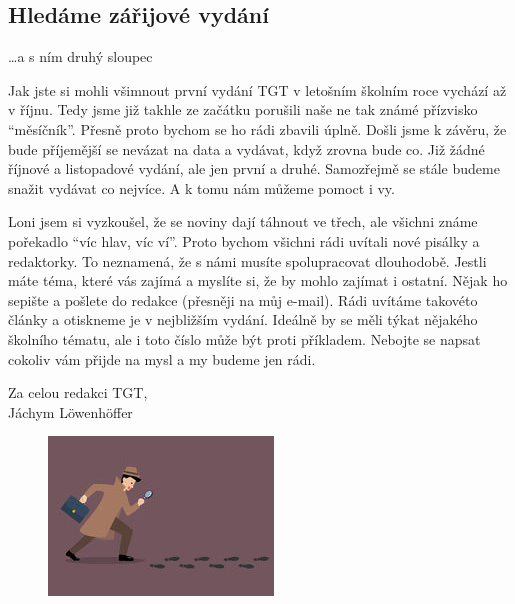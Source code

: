 \documentclass[12pt, a4paper]{article}
\begin{document}
	\begin{multicols*}{2}
		\setlength{\columnseprule}{1pt}
		
		
		\begin{center}\section*{Hledáme zářijové vydání} \end{center}
		\begin{flushright}
			\vspace*{-0.75\baselineskip}
			\footnotesize \dots a s ním druhý sloupec
		\end{flushright}
		Jak jste si mohli všimnout první vydání TGT v letošním školním roce vychází až v říjnu. Tedy jsme již takhle ze začátku porušili naše ne tak známé přízvisko “měsíčník”. Přesně proto bychom se ho rádi zbavili úplně. Došli jsme k závěru, že bude příjemější se nevázat na data a vydávat, když zrovna bude co. Již žádné říjnové a listopadové vydání, ale jen první a druhé. Samozřejmě se stále budeme snažit vydávat co nejvíce. A k tomu nám můžeme pomoct i vy. \par
		Loni jsem si vyzkoušel, že se noviny dají táhnout ve třech, ale všichni známe pořekadlo “víc hlav, víc ví”. Proto bychom všichni rádi uvítali nové pisálky a redaktorky. To neznamená, že s námi musíte spolupracovat dlouhodobě. Jestli máte téma, které vás zajímá a myslíte si, že by mohlo zajímat i ostatní. Nějak ho sepište a pošlete do redakce (přesněji na můj e-mail). Rádi uvítáme takovéto články a otiskneme je v nejbližším vydání. Ideálně by se měli týkat nějakého školního tématu, ale i toto číslo může být proti příkladem. Nebojte se napsat cokoliv vám přijde na mysl a my budeme jen rádi. \par 
		\begin{flushright}
			Za celou redakci TGT,\\Jáchym Löwenhöffer
		\end{flushright}

		\begin{figure}[H]
			\centering
		  	\includegraphics[width=.4\textwidth]{2}
	 	\end{figure}
		
		
		
	\end{multicols*}
\end{document}
